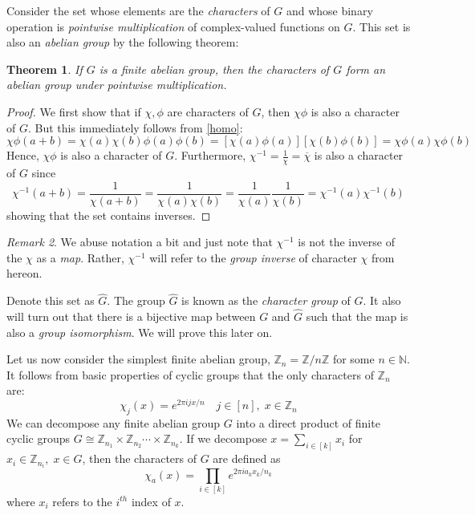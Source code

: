 \documentclass{amsart}
\newtheorem{theorem}{Theorem}[section]
\theoremstyle{definition}
\theoremstyle{remark}
\newtheorem{remark}[theorem]{Remark}
\numberwithin{equation}{section}
\theoremstyle{remark}
\begin{document}
Consider the set whose elements are the \emph{characters} of $G$ and whose binary operation is \emph{pointwise multiplication} of complex-valued functions on $G$. This set is also an \emph{abelian group} by the following theorem:
%
\begin{theorem}
  If $G$ is a finite abelian group, then the characters of $G$ form an abelian group under pointwise multiplication.
\end{theorem}
%
\begin{proof}
  We first show that if $\chi, \phi$ are characters of $G$, then $\chi\phi$ is also a character of $G$. But this immediately follows from \ref{homo}:
  $$ \chi\phi(a+b) = \chi(a)\chi(b)\phi(a)\phi(b) = [\chi(a)\phi(a)][\chi(b)\phi(b)] = \chi\phi(a)\chi\phi(b)$$
  Hence, $\chi\phi$ is also a character of $G$. Furthermore, $\chi^{-1} = \frac{1}{\chi} = \overline{\chi}$ is also a character of $G$ since
  $$ \chi^{-1}(a+b) = \frac{1}{\chi(a+b)} = \frac{1}{\chi(a)\chi(b)} = \frac{1}{\chi(a)}\frac{1}{\chi(b)} = \chi^{-1}(a)\chi^{-1}(b)$$
  showing that the set contains inverses.
\end{proof}
%
\begin{remark}
  We abuse notation a bit and just note that $\chi^{-1}$ is not the inverse of the $\chi$ as a \emph{map}. Rather, $\chi^{-1}$ will refer to the \emph{group inverse} of character $\chi$ from hereon.
\end{remark}

%
Denote this set as $\hat{G}$. The group $\hat{G}$ is known as the \emph{character group} of $G$. It also will turn out that there is a bijective map between $G$ and $\hat{G}$ such that the map is also a \emph{group isomorphism}. We will prove this later on. \newline

Let us now consider the simplest finite abelian group, $\mathbb{Z}_n = \mathbb{Z}/n\mathbb{Z}$ for some $n \in \mathbb{N}$. It follows from basic properties of cyclic groups that the only characters of $\mathbb{Z}_n$ are:
%
\begin{equation}
  \chi_j(x) = e^{ 2\pi i jx/n} \quad j \in [n], \; x \in \mathbb{Z}_n
\end{equation}
%
We can decompose any finite abelian group $G$ into a direct product of finite cyclic groups $G \cong \mathbb{Z}_{n_1} \times \mathbb{Z}_{n_2} \cdots \times\mathbb{Z}_{n_k}$. If we decompose $x = \sum_{i \in [k]} x_i$ for $x_i \in \mathbb{Z}_{n_i},\; x \in G$, then the characters of $G$ are defined as
%
\begin{equation}
  \chi_a(x) = \prod_{i \in [k]} e^{2 \pi i a_k x_k/ n_k}
\end{equation}
where $x_i$ refers to the $i^{th}$ index of $x$. \newline
\end{document}

